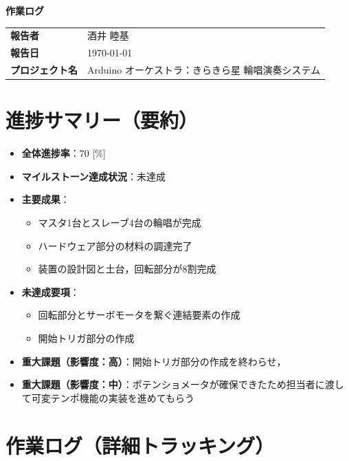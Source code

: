 \documentclass[a4paper,12pt]{ltjsarticle}
\begin{document}
\begin{center}
  {\LARGE\bfseries 作業ログ}
\end{center}

\vspace{4mm}

\begin{tabular}{ll}
  \textbf{報告者} & 酒井 睦基 \\
  \textbf{報告日} & \today \\
  \textbf{プロジェクト名} & Arduino オーケストラ：きらきら星 輪唱演奏システム \\
\end{tabular}

\vspace{6mm}

\section{進捗サマリー（要約）}

\begin{itemize}
  \item \textbf{全体進捗率}：70 [\%]
  \item \textbf{マイルストーン達成状況}：未達成
  \item \textbf{主要成果}：
    \begin{itemize}
      \item マスタ1台とスレーブ4台の輪唱が完成
      \item ハードウェア部分の材料の調達完了
      \item 装置の設計図と土台，回転部分が8割完成
    \end{itemize}
  \item \textbf{未達成要項}：
    \begin{itemize}
      \item 回転部分とサーボモータを繋ぐ連結要素の作成
      \item 開始トリガ部分の作成
    \end{itemize}
  \item \textbf{重大課題（影響度：高）}：開始トリガ部分の作成を終わらせ，
  \item \textbf{重大課題（影響度：中）}：ポテンショメータが確保できたため担当者に渡して可変テンポ機能の実装を進めてもらう
\end{itemize}

\section{作業ログ（詳細トラッキング）}
\end{document}
